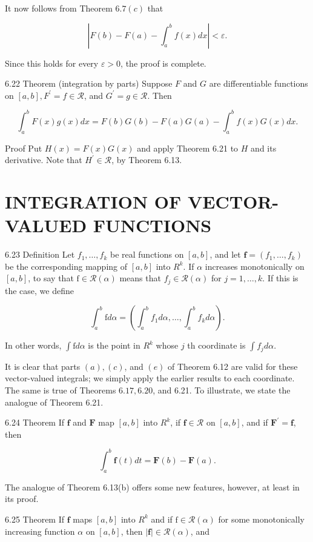 \documentclass[10pt]{article}
\begin{document}
It now follows from Theorem $6.7(c)$ that

$$
\left|F(b)-F(a)-\int_{a}^{b} f(x) d x\right|<\varepsilon .
$$

Since this holds for every $\varepsilon>0$, the proof is complete.

6.22 Theorem (integration by parts) Suppose $F$ and $G$ are differentiable functions on $[a, b], F^{\prime}=f \in \mathscr{R}$, and $G^{\prime}=g \in \mathscr{R}$. Then

$$
\int_{a}^{b} F(x) g(x) d x=F(b) G(b)-F(a) G(a)-\int_{a}^{b} f(x) G(x) d x .
$$

Proof Put $H(x)=F(x) G(x)$ and apply Theorem 6.21 to $H$ and its derivative. Note that $H^{\prime} \in \mathscr{R}$, by Theorem 6.13.

\section{INTEGRATION OF VECTOR-VALUED FUNCTIONS}
6.23 Definition Let $f_{1}, \ldots, f_{k}$ be real functions on $[a, b]$, and let $\mathbf{f}=\left(f_{1}, \ldots, f_{k}\right)$ be the corresponding mapping of $[a, b]$ into $R^{k}$. If $\alpha$ increases monotonically on $[a, b]$, to say that $\mathrm{f} \in \mathscr{R}(\alpha)$ means that $f_{j} \in \mathscr{R}(\alpha)$ for $j=1, \ldots, k$. If this is the case, we define

$$
\int_{a}^{b} \mathrm{f} d \alpha=\left(\int_{a}^{b} f_{1} d \alpha, \ldots, \int_{a}^{b} f_{k} d \alpha\right) .
$$

In other words, $\int \mathrm{f} d \alpha$ is the point in $R^{k}$ whose $j$ th coordinate is $\int f_{j} d \alpha$.

It is clear that parts $(a),(c)$, and $(e)$ of Theorem 6.12 are valid for these vector-valued integrals; we simply apply the earlier results to each coordinate. The same is true of Theorems $6.17,6.20$, and 6.21. To illustrate, we state the analogue of Theorem 6.21.

6.24 Theorem If $\mathbf{f}$ and $\mathbf{F}$ map $[a, b]$ into $R^{k}$, if $\mathbf{f} \in \mathscr{R}$ on $[a, b]$, and if $\mathbf{F}^{\prime}=\mathbf{f}$, then

$$
\int_{a}^{b} \mathbf{f}(t) d t=\mathbf{F}(b)-\mathbf{F}(a) .
$$

The analogue of Theorem 6.13(b) offers some new features, however, at least in its proof.

6.25 Theorem If $\mathbf{f}$ maps $[a, b]$ into $R^{k}$ and if $\mathrm{f} \in \mathscr{R}(\alpha)$ for some monotonically increasing function $\alpha$ on $[a, b]$, then $|\mathbf{f}| \in \mathscr{R}(\alpha)$, and
\end{document}
